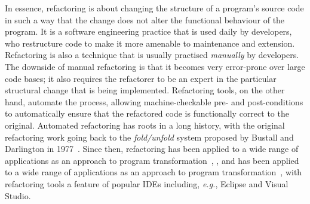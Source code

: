 \documentclass[a4paper,11pt]{article}
\begin{document}
In essence, refactoring is about changing the structure of a program's source code in such a way that the change does not alter the functional behaviour of the program. It is a software engineering practice that is used daily by developers, who restructure code to make it more amenable to maintenance and extension. Refactoring is also a technique that is usually practised \emph{manually} by developers. The downside of manual refactoring is that it becomes very error-prone over large code bases; it also requires the refactorer to be an expert in the particular structural change that is being implemented. Refactoring tools, on the other hand, automate the process, allowing machine-checkable pre- and post-conditions to automatically ensure that the refactored code is functionally correct to the original. 
%
Automated refactoring has roots in a long history, with the original refactoring work going back to the \emph{fold/unfold} system proposed by Bustall and Darlington in 1977~\cite{darlington77}. Since then, refactoring has been applied to a wide range of applications as an approach to program transformation~\cite{Mens:2004:SSR:972215.972286}, , and has been applied to a wide range of applications as an approach to program transformation~\cite{mens_refactoring}, with refactoring tools a feature of popular IDEs including, \textit{e.g.}, Eclipse and Visual Studio.

\end{document}
